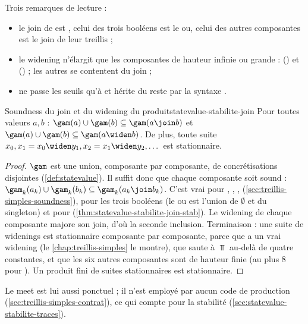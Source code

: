 Trois remarques de lecture :
\begin{itemize}
  \item le join de  est , celui des trois booléens est
    le \og ou\fg{}, celui des autres composantes est le join de leur
    treillis ;
  \item le widening n'élargit que les composantes de hauteur infinie ou
    grande :  () et 
    () ; les autres se contentent du join ;
  \item {} ne passe les seuils qu'à  et hérite du
    reste par la syntaxe .
\end{itemize}

\begin{theoreme}{Soundness du join et du widening du produit}{statevalue-stabilite-join}
  Pour toutes valeurs $a, b$ : $\gam(a) \cup \gam(b) \subseteq \gam(a
  \join b)$ et $\gam(a) \cup \gam(b) \subseteq \gam(a \widen b)$. De plus,
  toute suite $x_0, x_1 = x_0 \widen y_1, x_2 = x_1 \widen y_2, \dots$ est
  stationnaire.
\end{theoreme}
\begin{proof}
  $\gam$ est une union, composante par composante, de concrétisations
  disjointes (\cref{def:statevalue}). Il suffit donc que chaque composante
  soit sound : $\gam_k(a_k) \cup \gam_k(b_k) \subseteq \gam_k(a_k \join
  b_k)$. C'est vrai pour , , ,
   (\cref{sec:treillis-simples-soundness}), pour les trois
  booléens (le \og ou\fg{} est l'union de $\emptyset$ et du singleton) et
  pour  (\cref{thm:statevalue-stabilite-join-stab}). Le
  widening de chaque composante majore son join, d'où la seconde inclusion.
  Terminaison : une suite de widenings est stationnaire composante par
  composante, parce que  a un vrai widening (le
  \cref{chap:treillis-simples} le montre), que  saute à $\Top$
  au-delà de quatre constantes, et que les six autres composantes sont de
  hauteur finie (au plus 8 pour ). Un produit fini de suites
  stationnaires est stationnaire.
\end{proof}

Le meet est lui aussi ponctuel ; il n'est employé par aucun code de
production (\cref{sec:treillis-simples-contrat}), ce qui compte pour la
stabilité (\cref{sec:statevalue-stabilite-traces}).

